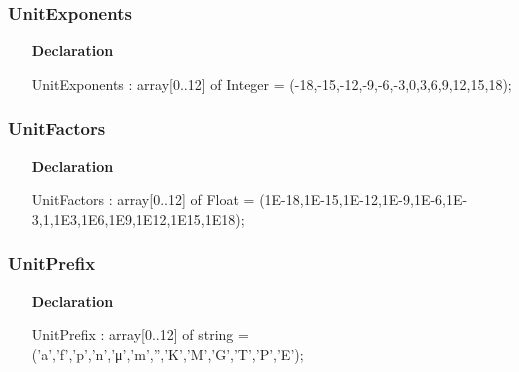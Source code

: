 \documentclass[12pt,a4paper,oneside]{report}
\newcommand{\declarationitem}[1]{\textbf{#1}}
\begin{document}
\subsubsection{UnitExponents}
\label{lmunitsformat-UnitExponents}
\begin{itemize}\item[\declarationitem{Declaration}\hfill]
	\begin{flushleft}
		\begin{ttfamily}
			UnitExponents : array[0..12] of Integer = (-18,-15,-12,-9,-6,-3,0,3,6,9,12,15,18);\end{ttfamily}
		
	\end{flushleft}
	
\end{itemize}
\subsubsection{UnitFactors}
\label{lmunitsformat-UnitFactors}
\begin{itemize}\item[\declarationitem{Declaration}\hfill]
	\begin{flushleft}
		\begin{ttfamily}
			UnitFactors : array[0..12] of Float = (1E-18,1E-15,1E-12,1E-9,1E-6,1E-3,1,1E3,1E6,1E9,1E12,1E15,1E18);\end{ttfamily}
		
	\end{flushleft}
	
\end{itemize}
\subsubsection{UnitPrefix}
\label{lmunitsformat-UnitPrefix}
\begin{itemize}\item[\declarationitem{Declaration}\hfill]
	\begin{flushleft}
		\begin{ttfamily}
			UnitPrefix  : array[0..12] of string = ('a','f','p','n','μ','m','','K','M','G','T','P','E');\end{ttfamily}
		
	\end{flushleft}
	
\end{itemize}
\end{document}
